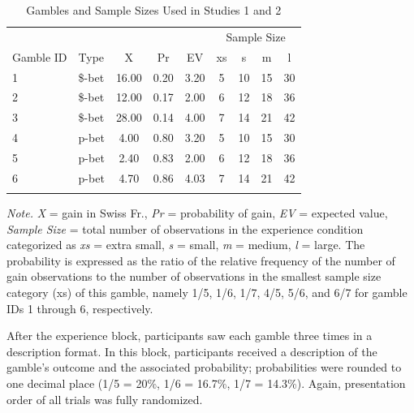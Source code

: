 \documentclass[a4paper, man, natbib, floatsintext]{apa6}
\begin{document}
\begin{table}[bth]
\begin{center}
\begin{threeparttable}
\caption{Gambles and Sample Sizes Used in Studies 1 and 2\label{table:Lotteries}}
\begin{tabular}{llccccccc}
\toprule
 &  &  &  &  & \multicolumn{4}{c}{Sample Size} \\
\cmidrule(r){6-9}
Gamble ID & Type & X & Pr & EV & xs & s & m & l\\
\midrule
1 & \$-bet & 16.00 & 0.20 & 3.20 & 5 & 10 & 15 & 30\\
2 & \$-bet & 12.00 & 0.17 & 2.00 & 6 & 12 & 18 & 36\\
3 & \$-bet & 28.00 & 0.14 & 4.00 & 7 & 14 & 21 & 42\\
4 & p-bet & 4.00 & 0.80 & 3.20 & 5 & 10 & 15 & 30\\
5 & p-bet & 2.40 & 0.83 & 2.00 & 6 & 12 & 18 & 36\\
6 & p-bet & 4.70 & 0.86 & 4.03 & 7 & 14 & 21 & 42\\
\bottomrule
\addlinespace
\end{tabular}
\begin{tablenotes}[para]
\normalsize{\textit{Note.} \textit{X} = gain in Swiss Fr., \textit{Pr} = probability of gain, \textit{EV} = expected value, \textit{Sample Size} = total number of observations in the experience condition categorized as \textit{xs} = extra small, \textit{s} = small, \textit{m} = medium, \textit{l} = large. The probability is expressed as the ratio of the relative frequency of the number of gain observations to the number of observations in the smallest sample size category (xs) of this gamble, namely 1/5, 1/6, 1/7, 4/5, 5/6, and 6/7 for gamble IDs 1 through 6, respectively.}
\end{tablenotes}
\end{threeparttable}
\end{center}
\end{table}

After the experience block, participants saw each gamble three times in a description format. In this block, participants received a description of the gamble's outcome and the associated probability; probabilities were rounded to one decimal place (1/5 = 20\%, 1/6 = 16.7\%, 1/7 = 14.3\%). Again, presentation order of all trials was fully randomized.
\end{document}
